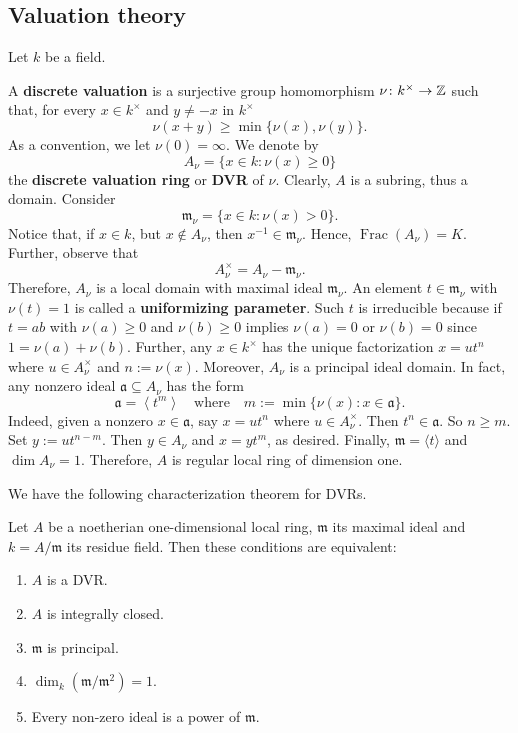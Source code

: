 \subsection{Valuation theory}
Let $k$ be a field. 
\begin{definition}\label{def:discrete-valuation}
	A \textbf{discrete valuation} is a surjective group homomorphism $\nu\colon k^{\times} \to {\mathbb Z}$ such that, for every $x\in k^{\times}$ and $y \neq -x$ in $k^{\times}$
	\[
		\nu(x + y) \geq \min\{\nu(x), \nu(y)\}.
	\]
	As a convention, we let $\nu(0) = \infty$. We denote by
	\[
	A_{\nu} = \{x \in k\colon \nu(x)\geq 0\}
	\]
	the \textbf{discrete valuation ring} or \textbf{DVR} of $\nu$. Clearly, $A$ is a subring, thus a domain. Consider
	\[
		\mathfrak{m}_{\nu} = \{x\in k\colon \nu(x) > 0\}. 
	\]
	Notice that, if $x\in k$, but $x\notin A_{\nu}$, then $x^{-1}\in \mathfrak{m}_{\nu}$. Hence, $\operatorname{Frac}(A_{\nu}) = K$. Further, observe that
	\[
	A_{\nu}^{\times} = A_{\nu} - \mathfrak{m}_{\nu}.
	\]
	Therefore, $A_{\nu}$ is a local domain with maximal ideal $\mathfrak{m}_{\nu}$. An element $t \in \mathfrak{m}_{\nu}$ with $\nu(t) = 1$ is called a \textbf{uniformizing parameter}. Such $t$ is irreducible because if $t = ab$ with $\nu(a)\geq 0$ and $\nu(b)\geq 0$ implies $\nu(a) = 0$ or $\nu(b) = 0$ since $1 = \nu(a) + \nu(b)$. Further, any $x \in k^{\times}$ has the unique factorization $x = u t^{n}$ where $u \in A_{\nu}^{\times}$ and $n := \nu(x)$. Moreover, $A_{\nu}$ is a principal ideal domain. In fact, any nonzero ideal $\mathfrak{a} \subseteq A_{\nu}$ has the form
	\[
		\mathfrak{a} = \left\langle t^{m}\right\rangle \quad\text{where}\quad m:=\min\{\nu(x)\colon x\in \mathfrak{a}\}.
	\]
	Indeed, given a nonzero $x \in \mathfrak{a}$, say $x = ut^{n}$ where $u \in A_{\nu}^{\times}$. Then $t^{n}\in \mathfrak{a}$. So $n \geq m$. Set $y := ut^{n-m}$. Then $y\in A_\nu$ and $x = yt^{m}$, as desired. Finally, $\mathfrak{m} = \langle t\rangle$ and $\dim A_{\nu} = 1$. Therefore, $A$ is regular local ring of dimension one.
\end{definition}
We have the following characterization theorem for DVRs.
\begin{theorem}\label{thm:characterization-of-DVRs}
	Let $A$ be a noetherian one-dimensional local ring, $\mathfrak{m}$ its maximal ideal and $k = A/\mathfrak{m}$ its residue field. Then these conditions are equivalent:
	\begin{enumerate}[label = (\roman*)]
		\item $A$ is a DVR.
		\item $A$ is integrally closed.
		\item $\mathfrak{m}$ is principal.
		\item $\dim_{k}(\mathfrak{m}/\mathfrak{m}^{2}) = 1$.
		\item Every non-zero ideal is a power of $\mathfrak{m}$.
	\end{enumerate}
\end{theorem}

